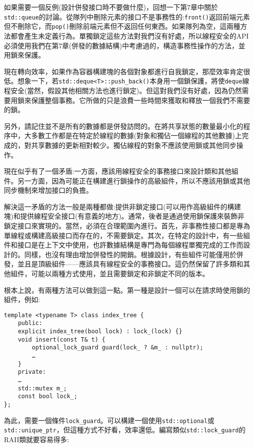 如果需要一個反例(設計併發接口時不要做什麼)，回想一下第7章中關於\texttt{std::queue}的討論。從隊列中刪除元素的接口不是事務性的:\texttt{front()}返回前端元素但不刪除它，而\texttt{pop()}刪除前端元素但不返回任何東西。如果隊列為空，這兩種方法都會產生未定義行為。單獨鎖定這些方法對我們沒有好處，所以線程安全的API必須使用我們在第7章(併發的數據結構)中考慮過的，構造事務性操作的方法，並用鎖來保護。

現在轉向效率，如果作為容器構建塊的各個對象都進行自我鎖定，那麼效率肯定很低。想象一下，若\texttt{std::deque<T>::push\_back()}本身用一個鎖保護，將使\texttt{deque}線程安全(當然，假設其他相關方法也進行鎖定)。但這對我們沒有好處，因為仍然需要用鎖來保護整個事務。它所做的只是浪費一些時間來獲取和釋放一個我們不需要的鎖。

另外，請記住並不是所有的數據都是併發訪問的。在將共享狀態的數量最小化的程序中，大多數工作都是在特定於線程的數據(對象和獨佔一個線程的其他數據)上完成的，對共享數據的更新相對較少。獨佔線程的對象不應該使用鎖或其他同步操作。

現在似乎有了一個矛盾:一方面，應該用線程安全的事務接口來設計類和其他組件。另一方面，因為可能正在構建進行鎖操作的高級組件，所以不應該用鎖或其他同步機制來增加接口的負擔。 

解決這一矛盾的方法一般是兩種都做:提供非鎖定接口(可以用作高級組件的構建塊)和提供線程安全接口(有意義的地方)。通常，後者是通過使用鎖保護來裝飾非鎖定接口來實現的。當然，必須在合理範圍內進行。首先，非事務性接口都是專為單線程或構建高級接口而存在的，不需要鎖定。其次，在特定的設計中，有一些組件和接口是在上下文中使用，也許數據結構是專門為每個線程單獨完成的工作而設計的。同樣，也沒有理由增加併發性的開銷。根據設計，有些組件可能僅用於併發，並且是頂級組件——應該具有線程安全的事務接口。這仍然保留了許多類和其他組件，可能以兩種方式使用，並且需要鎖定和非鎖定不同的版本。

根本上說，有兩種方法可以做到這一點。第一種是設計一個可以在請求時使用鎖的組件，例如:

\begin{lstlisting}[style=styleCXX]
template <typename T> class index_tree {
	public:
	explicit index_tree(bool lock) : lock_(lock) {}
	void insert(const T& t) {
		optional_lock_guard guard(lock_ ? &m_ : nullptr);
		…
	}
	private:
	…
	std::mutex m_;
	const bool lock_;
};
\end{lstlisting}

為此，需要一個條件\texttt{lock\_guard}。可以構建一個使用\texttt{std::optional}或\texttt{std::unique\_ptr}，但這種方式不好看，效率還低。編寫類似\texttt{std::lock\_guard}的RAII類就要容易得多:

